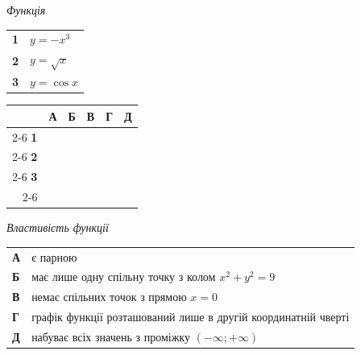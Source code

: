 \documentclass[14pt]{extarticle}
\newcommand{\answerGrid}{
    \begingroup
    \renewcommand{\arraystretch}{1.3} 
    \setlength{\tabcolsep}{7pt} 
    \begin{tabular}{r|c|c|c|c|c|}
         \multicolumn{1}{c}{} & \multicolumn{1}{c}{\textbf{А}} & \multicolumn{1}{c}{\textbf{Б}} & \multicolumn{1}{c}{\textbf{В}} & \multicolumn{1}{c}{\textbf{Г}} & \multicolumn{1}{c}{\textbf{Д}} \\ \cline{2-6}
         \textbf{1} & & & & & \\ \cline{2-6}
         \textbf{2} & & & & & \\ \cline{2-6}
         \textbf{3} & & & & & \\ \cline{2-6}
    \end{tabular}
    \endgroup
}
\begin{document}
\noindent
\begin{minipage}[t]{0.45\textwidth}
    \textit{Функція} \par \vspace{0.2cm}
    \begin{tabular}{@{}p{0.5cm} l@{}}
    \textbf{1} & $y=-x^3$ \\[0.4cm]
    \textbf{2} & $y=\sqrt{x}$ \\[0.4cm]
    \textbf{3} & $y=\cos x$ \\
    \end{tabular}

    \vspace{1.0cm}
    \answerGrid
\end{minipage}%
\hfill
\begin{minipage}[t]{0.50\textwidth}
    \textit{Властивість функції} \par \vspace{0.2cm}
    \begin{tabular}{@{}p{0.5cm} p{7cm}@{}}
    \textbf{А} & є парною \\[0.2cm]
    \textbf{Б} & має лише одну спільну точку з колом $x^2+y^2=9$ \\[0.2cm]
    \textbf{В} & немає спільних точок з прямою $x=0$ \\[0.2cm]
    \textbf{Г} & графік функції розташований лише в другій координатній чверті \\[0.2cm]
    \textbf{Д} & набуває всіх значень з проміжку $(-\infty; +\infty)$ \\
    \end{tabular}
\end{minipage}

\vspace{0.7cm}
\end{document}
